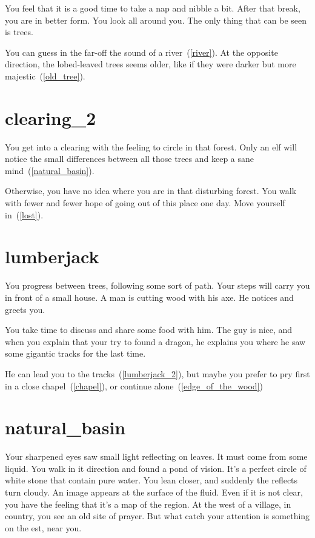 You feel that it is a good time to take a nap and nibble a bit. After that
break, you are in better form. You look all around you. The only thing that can
be seen is trees.

You can guess in the far-off the sound of a river~(\ref{river}). At the opposite
direction, the lobed-leaved trees seems older, like if they were darker but more
majestic~(\ref{old_tree}).

\section{clearing_2}

You get into a clearing with the feeling to circle in that forest. Only an elf
will notice the small differences between all those trees and keep a sane
mind~(\ref{natural_basin}).

Otherwise, you have no idea where you are in that disturbing forest. You walk
with fewer and fewer hope of going out of this place one day. Move yourself
in~(\ref{lost}).

\section{lumberjack}

You progress between trees, following some sort of path. Your steps will carry
you in front of a small house. A man is cutting wood with his axe. He notices
and greets you.

You take time to discuss and share some food with him. The guy is nice, and when
you explain that your try to found a dragon, he explains you where he saw some
gigantic tracks for the last time.

He can lead you to the tracks~(\ref{lumberjack_2}), but maybe you prefer to pry
first in a close chapel~(\ref{chapel}), or continue alone~(\ref{edge_of_the_wood})

\section{natural_basin}

Your sharpened eyes saw small light reflecting on leaves. It must come from some
liquid. You walk in it direction and found a pond of vision. It's a perfect
circle of white stone that contain pure water. You lean closer, and suddenly the
reflects turn cloudy. An image appears at the surface of the fluid. Even if it
is not clear, you have the feeling that it's a map of the region. At the west of
a village, in country, you see an old site of prayer. But what catch your
attention is something on the est, near you.

